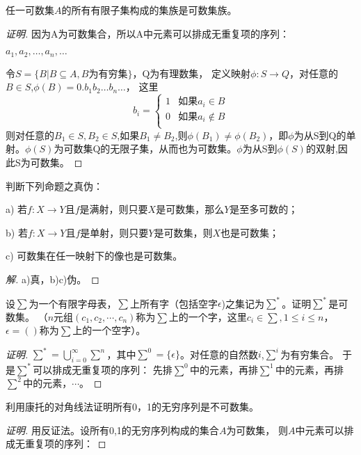 \documentclass{article}
\begin{document}
\begin{CJK}{UTF8}{gbsn}
\clearpage
\begin{Exercise}
  任一可数集$A$的所有有限子集构成的集族是可数集族。
\end{Exercise}
\begin{proof}[证明]
  因为A为可数集合，所以A中元素可以排成无重复项的序列：

  $a_1,a_2,\ldots,a_n,\ldots$

令$S=\{B|B\subseteq A,B\text{为有穷集}\}$，Q为有理数集，
定义映射$\phi:S\to Q$，对任意的$B\in S$,$\phi(B)=0.b_1b_2\ldots b_n\ldots$，
这里
\[
b_i=\begin{cases}
  1&\text{如果}a_i\in B\\
  0&\text{如果}a_i\notin B\\
\end{cases}  
\]
则对任意的$B_1\in S, B_2\in S$,如果$B_1\neq B_2$,则$\phi(B_1)\neq \phi(B_2)$，即$\phi$为从S到Q的单射。$\phi(S)$为可数集Q的无限子集，从而也为可数集。$\phi$为从S到$\phi(S)$的双射,因此S为可数集。
\end{proof}
\begin{Exercise}
  判断下列命题之真伪：

 a) 若$f:X\to Y$且$f$是满射，则只要$X$是可数集，那么$Y$是至多可数的；

 b) 若$f:X\to Y$且$f$是单射，则只要$Y$是可数集，则$X$也是可数集；

 c) 可数集在任一映射下的像也是可数集。
\end{Exercise}
\begin{proof}[解]
a)真，b)c)伪。
\end{proof}
\begin{Exercise}
  设$\sum$为一个有限字母表，$\sum$上所有字（包括空字$\epsilon$)之集记为$\sum^*$。证明$\sum^*$是可数集。
  （$n$元组$(c_1,c_2,\cdots,c_n)$称为$\sum$上的一个字，这里$c_i\in \sum, 1\leq i\leq n$，$\epsilon=()$称为$\sum$上的一个空字）。
\end{Exercise}
\begin{proof}[证明]
$\sum^*=\bigcup_{i=0}^{\infty}\sum^n$，其中$\sum^0=\{\epsilon\}$。对任意的自然数$i$,$\sum^i$为有穷集合。
于是$\sum^*$可以排成无重复项的序列：
先排$\sum^0$中的元素，再排$\sum^1$中的元素，再排$\sum^2$中的元素，$\cdots$。
\end{proof}
\begin{Exercise}
  利用康托的对角线法证明所有0，1的无穷序列是不可数集。
\end{Exercise}
\begin{proof}[证明]
  用反证法。设所有0,1的无穷序列构成的集合$A$为可数集，
  则$A$中元素可以排成无重复项的序列：


\end{proof}
\end{CJK}
\end{document}
